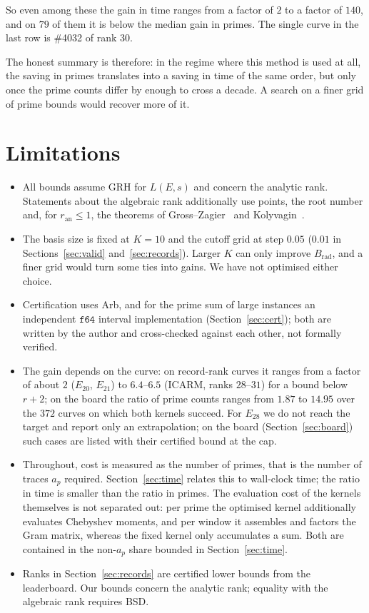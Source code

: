 \documentclass[11pt]{amsart}
\theoremstyle{remark}
\theoremstyle{definition}
\newcommand{\ran}{r_{\mathrm{an}}}
\begin{document}
\noindent
So even among these the gain in time ranges from a factor of $2$ to a factor of $140$, and on $79$ of
them it is below the median gain in primes. The single curve in the last row is \#4032 of rank $30$.

The honest summary is therefore: in the regime where this method is used at all, the saving in
primes translates into a saving in time of the same order, but only once the prime counts differ
by enough to cross a decade. A search on a finer grid of prime bounds would recover more of it.

\section{Limitations}
\begin{itemize}
\item All bounds assume GRH for $L(E,s)$ and concern the analytic rank. Statements about the algebraic rank additionally use points, the root number and, for $\ran\le1$, the theorems of Gross--Zagier~\cite{GZ} and Kolyvagin~\cite{Kolyvagin}.
\item The basis size is fixed at $K=10$ and the cutoff grid at step $0.05$ ($0.01$ in Sections~\ref{sec:valid} and~\ref{sec:records}). Larger $K$ can only improve $B_{\mathrm{rad}}$, and a finer grid would turn some ties into gains. We have not optimised either choice.
\item Certification uses Arb, and for the prime sum of large instances an independent $\mathtt{f64}$ interval implementation (Section~\ref{sec:cert}); both are written by the author and cross-checked against each other, not formally verified.
\item The gain depends on the curve: on record-rank curves it ranges from a factor of about $2$ ($E_{20}$, $E_{21}$) to $6.4$--$6.5$ (ICARM, ranks $28$--$31$) for a bound below $r+2$; on the board the ratio of prime counts ranges from $1.87$ to $14.95$ over the $372$ curves on which both kernels succeed. For $E_{28}$ we do not reach the target and report only an extrapolation; on the board (Section~\ref{sec:board}) such cases are listed with their certified bound at the cap.
\item Throughout, cost is measured as the number of primes, that is the number of traces $a_p$
required. Section~\ref{sec:time} relates this to wall-clock time; the ratio in time is smaller
than the ratio in primes. The evaluation cost of the kernels themselves is not separated out:
per prime the optimised kernel additionally evaluates Chebyshev moments, and per window it
assembles and factors the Gram matrix, whereas the fixed kernel only accumulates a sum. Both
are contained in the non-$a_p$ share bounded in Section~\ref{sec:time}.
\item Ranks in Section~\ref{sec:records} are certified lower bounds from the leaderboard. Our bounds concern the analytic rank; equality with the algebraic rank requires BSD.
\end{itemize}
\end{document}
